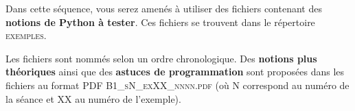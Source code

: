 

Dans cette séquence, vous serez amenés à utiliser des fichiers contenant des \textbf{notions de Python à tester}. Ces fichiers se trouvent dans le répertoire \mbox{\textsc{exemples}}.

\medskip

Les fichiers sont nommés selon un ordre chronologique. Des \textbf{notions plus théoriques} ainsi que des \textbf{astuces de programmation} sont proposées dans les fichiers au format PDF \mbox{\textsc{B1\_sN\_exXX\_nnnn.pdf}} (où N correspond au numéro de la séance et XX au numéro de l'exemple).


